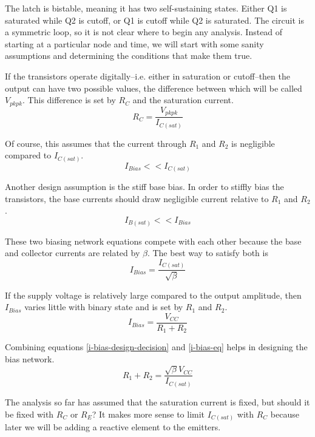 \documentclass[titlepage, letterpaper, 10.5pt]{article}
\begin{document}
The latch is bistable, meaning it has two self-sustaining states.
Either Q1 is saturated while Q2 is cutoff, or Q1 is cutoff while Q2 is saturated.
The circuit is a symmetric loop, so it is not clear where to begin any analysis.
Instead of starting at a particular node and time, we will start with some sanity
assumptions and determining the conditions that make them true.

If the transistors operate digitally--i.e. either in saturation or cutoff--then the output
can have two possible values, the difference between which will be called $V_{pkpk}$.
This difference is set by $R_{C}$ and the saturation current.
\begin{equation}
R_{C}=\frac{V_{pkpk}}{I_{C(sat)}}
\label{rc-eq}
\end{equation}

Of course, this assumes that the current through $R_{1}$ and $R_{2}$ is negligible compared to $I_{C(sat)}$.
\begin{equation*}
I_{Bias}<<I_{C(sat)}
\end{equation*}

Another design assumption is the stiff base bias.
In order to stiffly bias the transistors, the base currents should draw negligible current
relative to $R_{1}$ and $R_{2}$.
\begin{equation*}
I_{B(sat)}<<I_{Bias}
\end{equation*}

These two biasing network equations
compete with each other because the base and collector currents are related by $\beta$.
The best way to satisfy both is
\begin{equation}
I_{Bias}=\frac{I_{C(sat)}}{\sqrt{\beta}}
\label{i-bias-design-decision}
\end{equation}

If the supply voltage is relatively large compared to the output amplitude,
then $I_{Bias}$ varies little with binary state and is set by $R_{1}$ and $R_{2}$.
\begin{equation}
I_{Bias}=\frac{V_{CC}}{R_{1}+R_{2}}
\label{i-bias-eq}
\end{equation}

Combining equations \ref{i-bias-design-decision} and \ref{i-bias-eq} helps in designing
the bias network.
\begin{equation}
R_{1}+R_{2}=\frac{\sqrt{\beta}V_{CC}}{I_{C(sat)}}
\label{r1r2-eq}
\end{equation}

The analysis so far has assumed that the saturation current is fixed,
but should it be fixed with $R_{C}$ or $R_{E}$?
It makes more sense to limit $I_{C(sat)}$ with $R_{C}$ because
later we will be adding a reactive element to the emitters.
\end{document}

